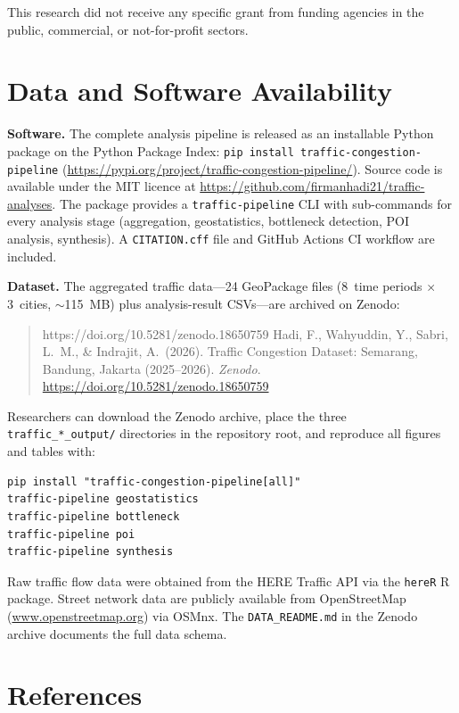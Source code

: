 \documentclass[12pt,a4paper]{article}
\begin{document}
This research did not receive any specific grant from funding agencies in the public, commercial, or not-for-profit sectors.



\section*{Data and Software Availability}

\textbf{Software.}  The complete analysis pipeline is released as an installable Python package on the Python Package Index: \texttt{pip install traffic-congestion-pipeline} (\url{https://pypi.org/project/traffic-congestion-pipeline/}). Source code is available under the MIT licence at \url{https://github.com/firmanhadi21/traffic-analyses}. The package provides a \texttt{traffic-pipeline} CLI with sub-commands for every analysis stage (aggregation, geostatistics, bottleneck detection, POI analysis, synthesis). A \texttt{CITATION.cff} file and GitHub Actions CI workflow are included.

\textbf{Dataset.}  The aggregated traffic data---24 GeoPackage files (8~time periods $\times$ 3~cities, $\sim$115~MB) plus analysis-result CSVs---are archived on Zenodo:

\begin{quote}https://doi.org/10.5281/zenodo.18650759
Hadi, F., Wahyuddin, Y., Sabri, L.~M., \& Indrajit, A.\ (2026). Traffic Congestion Dataset: Semarang, Bandung, Jakarta (2025--2026). \emph{Zenodo}. \url{https://doi.org/10.5281/zenodo.18650759}
\end{quote}

\noindent Researchers can download the Zenodo archive, place the three \texttt{traffic\_*\_output/} directories in the repository root, and reproduce all figures and tables with:

\begin{verbatim}
pip install "traffic-congestion-pipeline[all]"
traffic-pipeline geostatistics
traffic-pipeline bottleneck
traffic-pipeline poi
traffic-pipeline synthesis
\end{verbatim}

\noindent Raw traffic flow data were obtained from the HERE Traffic API via the \texttt{hereR} R package. Street network data are publicly available from OpenStreetMap (\url{www.openstreetmap.org}) via OSMnx. The \texttt{DATA\_README.md} in the Zenodo archive documents the full data schema.



\section*{References}
\end{document}
